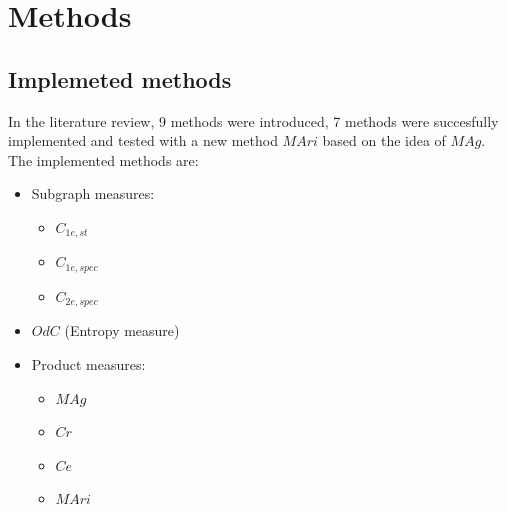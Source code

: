 \documentclass[12pt]{article}
\begin{document}
\section{Methods}
\subsection{Implemeted methods}
In the literature review, 9 methods were introduced, 7 methods were succesfully implemented and tested with a new method $MAri$ based on the idea of $MAg$. The implemented methods are:
\begin{itemize}
    \item Subgraph measures:
    \begin{itemize}
        \item $C_{1e,st}$
        \item $C_{1e,spec}$
        \item $C_{2e,spec}$
    \end{itemize}
    \item $OdC$ (Entropy measure)
    \item Product measures:
    \begin{itemize}
        \item $MAg$
        \item $Cr$
        \item $Ce$
        \item $MAri$
    \end{itemize}
\end{itemize}
\end{document}

